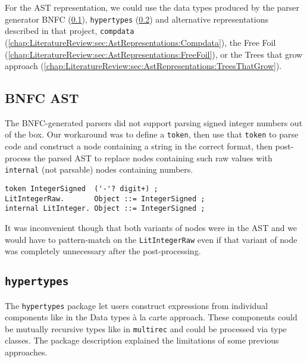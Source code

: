 For the AST representation, we could use the data types produced by the parser generator BNFC (\cref{chap:LiteratureReview:sec:AstRepresentations:BnfcAst}), \texttt{hypertypes} (\cref{chap:LiteratureReview:sec:AstRepresentations:Hypertypes}) and alternative representations described in that project, \texttt{compdata} (\cref{chap:LiteratureReview:sec:AstRepresentations:Compdata}), the Free Foil (\cref{chap:LiteratureReview:sec:AstRepresentations:FreeFoil}), or the Trees that grow approach (\cref{chap:LiteratureReview:sec:AstRepresentations:TreesThatGrow}).

\subsection{BNFC AST}
\label{chap:LiteratureReview:sec:AstRepresentations:BnfcAst}

The BNFC-generated parsers did not support parsing signed integer numbers out of the box.
Our workaround was to define a \texttt{token}, then use that \texttt{token} to parse code and construct a node containing a string in the correct format, then post-process the parsed AST to replace nodes containing such raw values with \texttt{internal} (not parsable) nodes containing numbers.

\begin{verbatim}
token IntegerSigned  ('-'? digit+) ;
LitIntegerRaw.       Object ::= IntegerSigned ;
internal LitInteger. Object ::= IntegerSigned ;
\end{verbatim}

It was inconvenient though that both variants of nodes were in the AST and we would have to pattern-match on the \texttt{LitIntegerRaw} even if that variant of node was completely unnecessary after the post-processing.

\subsection{\texttt{hypertypes}}
\label{chap:LiteratureReview:sec:AstRepresentations:Hypertypes}

The \texttt{hypertypes} package \cite{hypertypes-hackage} let users construct expressions from individual components like in the Data types à la carte \cite{swierstra-data-2008} approach. These components could be mutually recursive types like in \texttt{multirec} \cite{multirec-hackage} and could be processed via type classes. The package description explained the limitations of some previous approaches.

